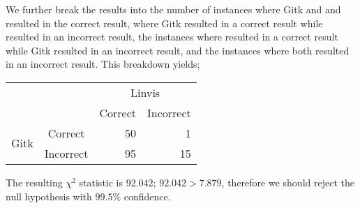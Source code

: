 We further break the results into the number of instances where Gitk and
and \tool resulted in the correct result, where Gitk resulted in a
correct result while \tool resulted in an incorrect result, the
instances where \tool resulted in a correct result while Gitk resulted
in an incorrect result, and the instances where both resulted in an
incorrect result. This breakdown yields;

\begin{center}
  \begin{tabular}{cc|rr}
                          &           & \multicolumn{2}{c}{Linvis}\\
                          &           & Correct                      & Incorrect\\\hline
    \multirow{2}{*}{Gitk} & Correct   & 50                           & 1\\
                          & Incorrect & 95                           & 15\\
  \end{tabular}
\end{center}

The resulting $\chi^2$ statistic is $92.042$; $92.042 > 7.879$,
therefore we should reject the null hypothesis with $99.5\%$ confidence.
